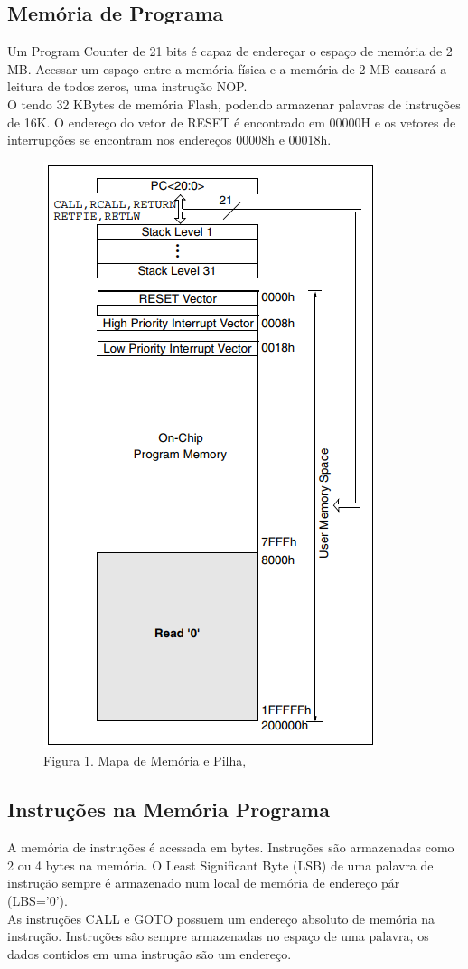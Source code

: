 \documentclass[12pt]{article}
\begin{document}
\subsection{Memória de Programa}
Um Program Counter de 21 bits é capaz de endereçar o espaço de memória de 2 MB. Acessar um espaço entre a memória física e a memória de 2 MB causará a leitura de todos zeros, uma instrução NOP.\\
O tendo 32 KBytes de memória Flash,  podendo armazenar palavras de instruções de 16K.
O endereço  do vetor de RESET é encontrado em 00000H e os vetores de interrupções se encontram nos endereços 00008h e 00018h.
\begin{figure}[ht]
\centering
\includegraphics[width=.5\textwidth]{figs/memory-1.png}
\caption{Figura 1. Mapa de Memória e Pilha, }
\end{figure}
\subsection{Instruções na Memória Programa}
A memória de instruções é acessada em bytes. Instruções são armazenadas como 2 ou 4 bytes na memória. O Least Significant Byte (LSB) de uma palavra de instrução sempre é armazenado num local de memória de endereço pár (LBS=’0’).\\
As instruções CALL e GOTO possuem um endereço absoluto de memória na instrução. Instruções são sempre armazenadas no espaço de uma palavra, os dados contidos em uma instrução são um endereço.
\end{document}
